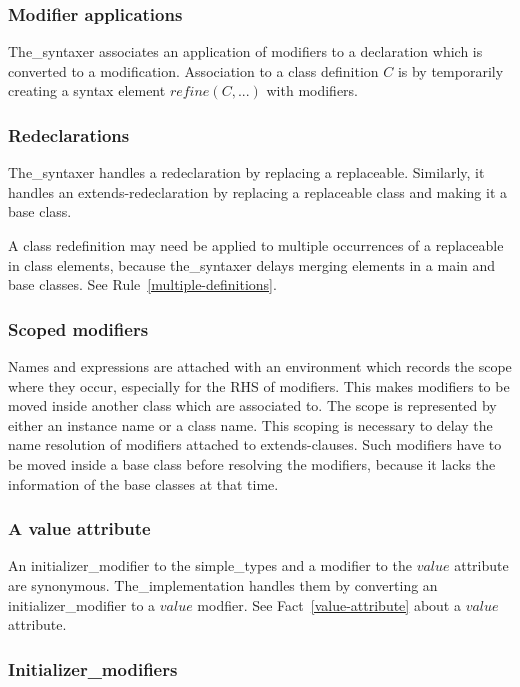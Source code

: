 \documentclass[10pt,b5paper]{article}
\begin{document}
\subsubsection*{Modifier applications}

The_syntaxer associates an application of modifiers to a declaration
which is converted to a modification.  Association to a class
definition $C$ is by temporarily creating a syntax element
$\mathit{refine}(C, ...)$ with modifiers.

\subsubsection*{Redeclarations}

The_syntaxer handles a redeclaration by replacing a replaceable.
Similarly, it handles an extends-redeclaration by replacing a
replaceable class and making it a base class.

A class redefinition may need be applied to multiple occurrences of a
replaceable in class elements, because the_syntaxer delays merging
elements in a main and base classes.  See
Rule~\ref{multiple-definitions}.

\subsubsection*{Scoped modifiers}

Names and expressions are attached with an environment which records
the scope where they occur, especially for the RHS of modifiers.  This
makes modifiers to be moved inside another class which are associated
to.  The scope is represented by either an instance name or a class
name.  This scoping is necessary to delay the name resolution of
modifiers attached to extends-clauses.  Such modifiers have to be
moved inside a base class before resolving the modifiers, because it
lacks the information of the base classes at that time.

\subsubsection*{A value attribute}

An initializer_modifier to the simple_types and a modifier to the
$\mathit{value}$ attribute are synonymous.  The_implementation handles
them by converting an initializer_modifier to a $\mathit{value}$
modfier.  See Fact~\ref{value-attribute} about a $\mathit{value}$
attribute.

\subsubsection*{Initializer_modifiers}
\end{document}
